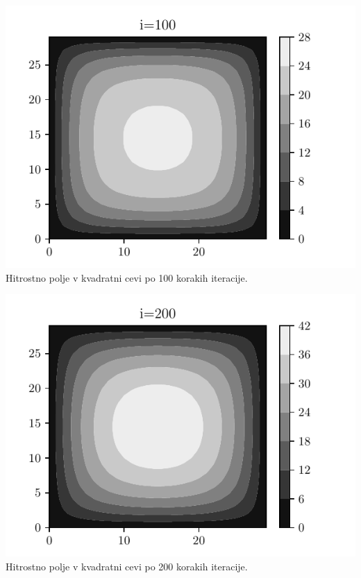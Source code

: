 \begin{center}
    \begin{minipage}{0.45\textwidth}
        \centering
    \includegraphics[width=\textwidth]{../old/0-kvadratna_i100.pdf}
    {Hitrostno polje v kvadratni cevi po 100 korakih iteracije.}
    \end{minipage}\hfill
    \begin{minipage}{0.45\textwidth}
        \centering
        \includegraphics[width=1\textwidth]{../old/0-kvadratna_i200.pdf}
    {Hitrostno polje v kvadratni cevi po 200 korakih iteracije. }
    \end{minipage}


\end{center}
